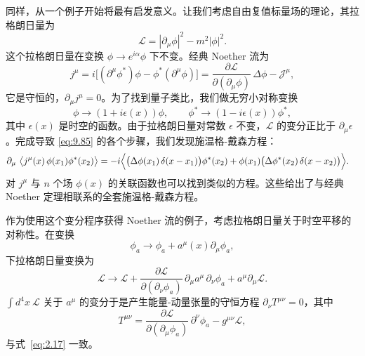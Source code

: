 同样，从一个例子开始将最有启发意义。让我们考虑自由复值标量场的理论，其拉格朗日量为
\begin{equation}
  \mathcal{L} = |\partial_\mu\phi|^2 - m^2|\phi|^2 .
  \label{eq:9.90}
\end{equation}
这个拉格朗日量在变换 $\phi\to e^{i\alpha}\phi$ 下不变。经典 Noether 流为
\begin{equation}
  j^\mu = i\bigl[ (\partial^\mu\phi^{*})\phi - \phi^{*}(\partial^\mu\phi) \bigr]
  = \frac{\partial\mathcal{L}}{\partial(\partial_\mu\phi)}\,\Delta\phi
    - \mathcal{J}^\mu ,
  \label{eq:9.96}
\end{equation}
它是守恒的，$\partial_\mu j^\mu = 0$。为了找到量子类比，我们做无穷小对称变换
\begin{equation}
  \phi \to (1 + i\epsilon(x))\phi,\qquad
  \phi^{*} \to (1 - i\epsilon(x))\phi^{*},
\end{equation}
其中 $\epsilon(x)$ 是时空的函数。由于拉格朗日量对常数 $\epsilon$ 不变，$\mathcal{L}$ 的变分正比于 $\partial_\mu\epsilon$。完成导致 \eqref{eq:9.85} 的各个步骤，我们发现施温格-戴森方程：
\begin{equation}
  \begin{aligned}
    \partial_\mu\ \bigl\langle j^\mu(x)\,\phi(x_1)\phi^{*}(x_2) \bigr\rangle
    &= -i\Bigl\langle \bigl( \Delta\phi(x_1)\,\delta(x-x_1) \bigr)
      \phi^{*}(x_2) + \phi(x_1)\bigl( \Delta\phi^{*}(x_2)\,
        \delta(x-x_2) \bigr) \Bigr\rangle .
  \end{aligned}
  \label{eq:9.98}
\end{equation}
对 $j^\mu$ 与 $n$ 个场 $\phi(x)$ 的关联函数也可以找到类似的方程。这些给出了与经典 Noether 定理相联系的全套施温格-戴森方程。

作为使用这个变分程序获得 Noether 流的例子，考虑拉格朗日量关于时空平移的对称性。在变换
\begin{equation}
  \phi_a \to \phi_a + a^\mu(x)\partial_\mu\phi_a ,
  \label{eq:9.99}
\end{equation}
下拉格朗日量变换为
\begin{equation}
  \mathcal{L} \to \mathcal{L} +
    \frac{\partial\mathcal{L}}{\partial(\partial_\nu\phi_a)}\,
      \partial_\mu a^\mu\,\partial_\nu\phi_a + a^\mu\partial_\mu\mathcal{L} .
\end{equation}
$\int d^4x\ \mathcal{L}$ 关于 $a^\mu$ 的变分于是产生能量-动量张量的守恒方程 $\partial_\nu T^{\mu\nu} = 0$，其中
\begin{equation}
  T^{\mu\nu} = \frac{\partial\mathcal{L}}{\partial(\partial_\mu\phi_a)}\,
    \partial^\nu\phi_a - g^{\mu\nu}\mathcal{L} ,
  \label{eq:9.100}
\end{equation}
与式~\eqref{eq:2.17} 一致。

